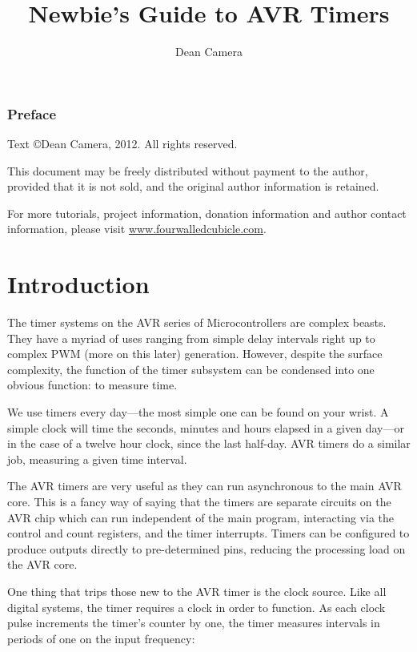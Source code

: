\documentclass[a4paper,oneside]{book}
\begin{document}
\title{Newbie's Guide to AVR Timers}
\author{Dean Camera}
\maketitle

\cleardoublepage
\subsection*{Preface}
Text \copyright Dean Camera, 2012. All rights reserved.

This document may be freely distributed without payment to the author, provided that it is not sold, and the original author information is retained.

For more tutorials, project information, donation information and author contact information, please visit \href{http://www.fourwalledcubicle.com}{www.fourwalledcubicle.com}.

\cleardoublepage
\tableofcontents
\cleardoublepage

\label{chp:Intro}
\chapter{Introduction}
The timer systems on the AVR series of Microcontrollers are complex beasts. They have a myriad of uses ranging from simple delay intervals right up to complex PWM (more on this later) generation. However, despite the surface complexity, the function of the timer subsystem can be condensed into one obvious function: to measure time.

We use timers every day---the most simple one can be found on your wrist. A simple clock will time the seconds, minutes and hours elapsed in a given day---or in the case of a twelve hour clock, since the last half-day. AVR timers do a similar job, measuring a given time interval.

The AVR timers are very useful as they can run asynchronous to the main AVR core. This is a fancy way of saying that the timers are separate circuits on the AVR chip which can run independent of the main program, interacting via the control and count registers, and the timer interrupts. Timers can be configured to produce outputs directly to pre-determined pins, reducing the processing load on the AVR core.

One thing that trips those new to the AVR timer is the clock source. Like all digital systems, the timer requires a clock in order to function. As each clock pulse increments the timer's counter by one, the timer measures intervals in periods of one on the input frequency: 
\end{document}
